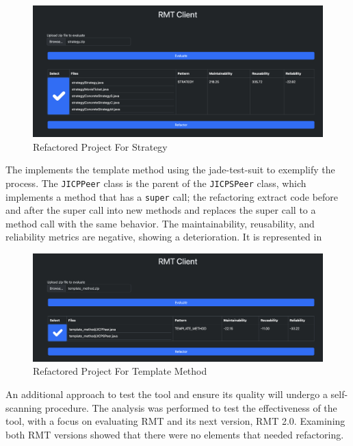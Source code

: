 \begin{figure}[ht!]
\caption{Refactored Project For Strategy}
\label{fig-strategy-client}
\includegraphics[width =\textwidth]{Chapter-5/Figures/rmt-strategy-client.png}
\end{figure}
\FloatBarrier

The \textcite{zafeiris2017automated} implements the template method using the jade-test-suit to exemplify the process. The \texttt{JICPPeer} class is the parent of the \texttt{JICPSPeer} class, which implements a method that has a \texttt{super} call; the refactoring extract code before and after the super call into new methods and replaces the super call to a method call with the same behavior. The maintainability, reusability, and reliability metrics are negative, showing a deterioration. It is represented in 

\begin{figure}[ht!]
\caption{Refactored Project For Template Method}
\label{fig-template-client}
\includegraphics[width =\textwidth]{Chapter-5/Figures/rmt-template-client.png}
\end{figure}
\FloatBarrier

An additional approach to test the tool and ensure its quality will undergo a self-scanning procedure. The analysis was performed to test the effectiveness of the tool, with a focus on evaluating RMT and its next version, RMT 2.0. Examining both RMT versions showed that there were no elements that needed refactoring. 

